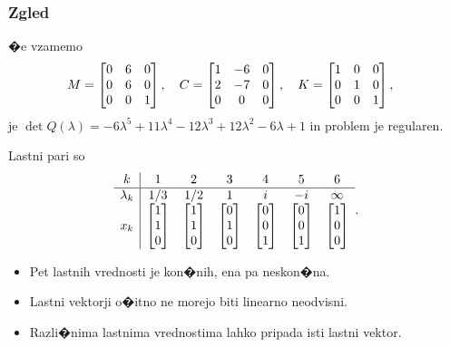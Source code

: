 \documentclass[9pt]{beamer}
\begin{document}
\begin{frame}
\frametitle{Zgled}

�e vzamemo
$$M=\left[\begin{matrix}0 & 6 & 0  \cr 0 & 6 & 0  \cr 0 & 0 & 1\end{matrix}\right],\quad
  C=\left[\begin{matrix}1 & -6 & 0 \cr 2 & -7 & 0 \cr 0 & 0 & 0\end{matrix}\right],\quad
  K=\left[\begin{matrix}1 & 0 & 0  \cr 0 & 1 & 0  \cr 0 & 0 & 1\end{matrix}\right],\quad
$$
je
$\det Q(\lambda)=-6\lambda ^5+11 \lambda ^4-12 \lambda^3+
 12 \lambda ^2-6\lambda +1$
in problem je regularen.\vspace{1em} \pause 

Lastni pari so
$$
  \begin{array}{c|cccccc}
   k & 1 & 2 & 3 & 4 & 5 & 6 \cr
    \hline  \lambda_k & {1/3} & {1/2} & 1 & i & -i & \infty \cr
     x_k & \left[\begin{matrix}1 \cr 1 \cr 0\end{matrix}\right] &
           \left[\begin{matrix}1 \cr 1 \cr 0\end{matrix}\right] &
           \left[\begin{matrix}0 \cr 1 \cr 0\end{matrix}\right] &
           \left[\begin{matrix}0 \cr 0 \cr 1\end{matrix}\right] &
           \left[\begin{matrix}0 \cr 0 \cr 1\end{matrix}\right] &
           \left[\begin{matrix}1 \cr 0 \cr 0\end{matrix}\right]
  \end{array}.
$$\pause
\begin{itemize}
\item Pet lastnih vrednosti je kon�nih, ena pa neskon�na.\pause
\item Lastni vektorji o�itno ne morejo biti linearno neodvisni.\pause
\item Razli�nima lastnima vrednostima lahko pripada isti lastni vektor.
\end{itemize}

\end{frame}
\end{document}
